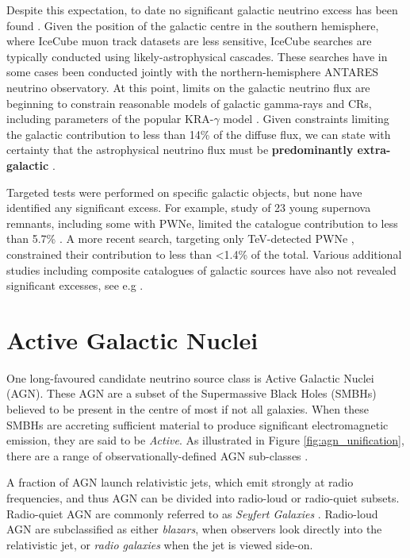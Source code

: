 Despite this expectation, to date no significant galactic neutrino excess has been found . Given the position of the galactic centre in the southern hemisphere, where IceCube muon track datasets are less sensitive, IceCube searches are typically conducted using likely-astrophysical cascades. These searches have in some cases been conducted jointly with the northern-hemisphere ANTARES neutrino observatory. At this point, limits on the galactic neutrino flux are beginning to constrain reasonable models of galactic gamma-rays and CRs, including parameters of the popular KRA-$\gamma$ model . Given constraints limiting the galactic contribution to less than 14\% of the diffuse flux, we can state with certainty that the astrophysical neutrino flux must be \textbf{predominantly extra-galactic} \cite{ic_17_galactic}. 

Targeted tests were performed on specific galactic objects, but none have identified any significant excess. For example,  study of 23 young supernova remnants, including some with PWNe, limited the catalogue contribution to less than 5.7\% \cite{ic_17_galactic}. A more recent search, targeting only TeV-detected PWNe , constrained their contribution to less than <1.4\% of the total. Various additional studies including composite catalogues of galactic sources have also not revealed significant excesses, see e.g .

\section{Active Galactic Nuclei}
\label{sec:agn}

One long-favoured candidate neutrino source class is Active Galactic Nuclei (AGN). These AGN are a subset of the Supermassive Black Holes (SMBHs) believed to be present in the centre of most if not all galaxies. When these SMBHs are  accreting sufficient material to produce significant electromagnetic emission, they are said to be \emph{Active}. As illustrated in Figure \ref{fig:agn_unification}, there are a range of observationally-defined AGN sub-classes . 

A fraction of AGN launch relativistic jets, which emit strongly at radio frequencies, and thus AGN can be divided into radio-loud or radio-quiet subsets. Radio-quiet AGN are commonly referred to as \emph{Seyfert Galaxies} . Radio-loud AGN are subclassified as either \emph{blazars}, when observers look directly into the relativistic jet, or \emph{radio galaxies} when the jet is viewed side-on.

